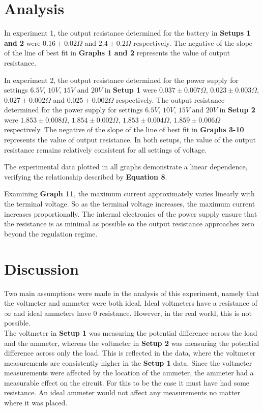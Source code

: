\documentclass[
	letterpaper, %
	10pt, %
]{CSUniSchoolLabReport}
\begin{document}
\section{Analysis}
In experiment 1, the output resistance determined for the battery in \textbf{Setups 1 and 2} were $ 0.16 \pm 0.02 \Omega $ and $ 2.4 \pm 0.2 \Omega $ respectively. The negative of the slope of the line of best fit in \textbf{Graphs 1 and 2} represents the value of output resistance.

In experiment 2, the output resistance determined for the power supply for settings $6.5V$, $10V$, $15V$ and $20V$ in \textbf{Setup 1} were $ 0.037 \pm 0.007 \Omega $, $ 0.023 \pm 0.003 \Omega $, $ 0.027 \pm 0.002 \Omega $ and $ 0.025 \pm 0.002 \Omega $ respectively. The output resistance determined for the power supply for settings $6.5V$, $10V$, $15V$ and $20V$ in \textbf{Setup 2} were $ 1.853 \pm 0.008 \Omega $, $ 1.854 \pm 0.002 \Omega $, $ 1.853 \pm 0.004 \Omega $, $ 1.859 \pm 0.006 \Omega $ respectively. The negative of the slope of the line of best fit in \textbf{Graphs 3-10} represents the value of output resistance. In both setups, the value of the output resistance remains relatively consistent for all settings of voltage.

The experimental data plotted in all graphs demonstrate a linear dependence, verifying the relationship described by \textbf{Equation 8}.

Examining \textbf{Graph 11}, the maximum current approximately varies linearly with the terminal voltage. So as the terminal voltage increases, the maximum current increases proportionally. The internal electronics of the power supply ensure that the resistance is as minimal as possible so the output resistance approaches zero beyond the regulation regime.
\newpage
\section{Discussion}
Two main assumptions were made in the analysis of this experiment, namely that the voltmeter and
ammeter were both ideal. Ideal voltmeters have a resistance of $\infty$ and ideal ammeters have $0$ resistance. However,
in the real world, this is not possible.\\

The voltmeter in \textbf{Setup 1} was measuring the potential difference across the load and the ammeter,
whereas the voltmeter in \textbf{Setup 2} was measuring the potential difference across only the load. This
is reflected in the data, where the voltmeter measurements are consistently higher in the \textbf{Setup 1}
data. Since the voltmeter measurements were affected by the location of the ammeter, the ammeter had
a measurable effect on the circuit. For this to be the case it must have had some resistance. An ideal ammeter
would not affect any measurements no matter where it was placed. \\
\end{document}
